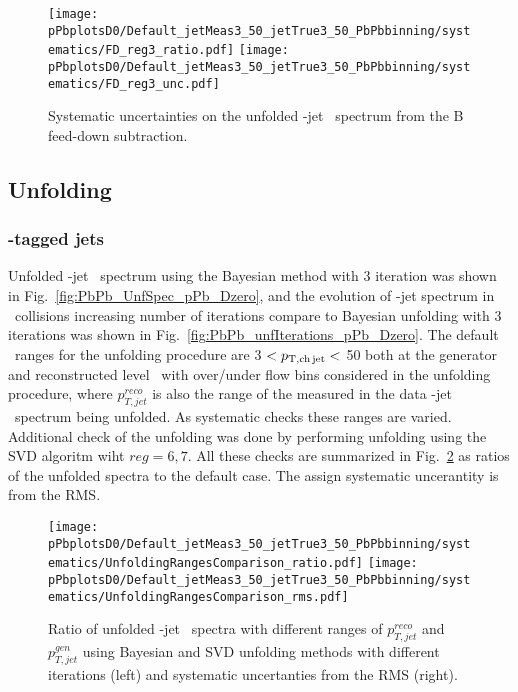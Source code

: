 \begin{figure}[bth]
\begin{center}
\texttt{[image: pPbplotsD0/Default\_jetMeas3\_50\_jetTrue3\_50\_PbPbbinning/systematics/FD\_reg3\_ratio.pdf]}
\texttt{[image: pPbplotsD0/Default\_jetMeas3\_50\_jetTrue3\_50\_PbPbbinning/systematics/FD\_reg3\_unc.pdf]}
\caption{Systematic uncertainties on the unfolded \Dzero-jet \pt\ spectrum from the B feed-down subtraction.} 
\label{fig:PbPb_BFeedDown_sysUnc_Dzero}
\end{center}
\end{figure}


\subsection{Unfolding}
\label{sUnfoldSys}

\subsubsection{\Dzero-tagged jets}

Unfolded \Dzero-jet \pt\ spectrum using the Bayesian method with 3 iteration was shown in Fig.~\ref{fig:PbPb_UnfSpec_pPb_Dzero}, and the evolution of \Dzero-jet spectrum in \pPb\ collisions increasing number of iterations compare to Bayesian unfolding with 3 iterations was shown in Fig.~\ref{fig:PbPb_unfIterations_pPb_Dzero}. 
The default \ptchjet\ ranges for the unfolding procedure are 3 $< p_{\mathrm{T,ch\, jet}}< $ 50 both at the generator and reconstructed level \pt\, with over/under flow bins considered in the unfolding procedure, where $p_{T,jet}^{reco}$ is also the range of the measured in the data \Dzero-jet \pt\ spectrum being unfolded. 
As systematic checks these ranges are varied.
Additional check of the unfolding was done by performing unfolding using the SVD algoritm wiht $reg=6,7$.
All these checks are summarized in Fig.~\ref{fig:PbPb_UnfSpec_pPb_Dzero_ranges} as ratios of the unfolded spectra to the default case. The assign systematic uncerantity is from the RMS.

\begin{figure}[bth]
\centering
\texttt{[image: pPbplotsD0/Default\_jetMeas3\_50\_jetTrue3\_50\_PbPbbinning/systematics/UnfoldingRangesComparison\_ratio.pdf]}
\texttt{[image: pPbplotsD0/Default\_jetMeas3\_50\_jetTrue3\_50\_PbPbbinning/systematics/UnfoldingRangesComparison\_rms.pdf]}
\caption{Ratio of unfolded \Dzero-jet \pt\ spectra with different ranges of $p_{T,jet}^{reco}$ and $p_{T,jet}^{gen}$ using Bayesian and SVD unfolding methods with different iterations (left) and systematic uncertanties from the RMS (right).}
\label{fig:PbPb_UnfSpec_pPb_Dzero_ranges}
\end{figure}

